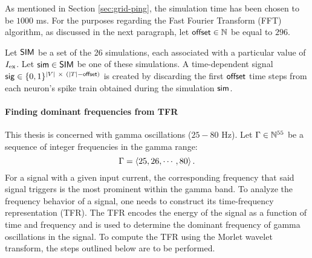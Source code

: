 As mentioned in Section \ref{sec:grid-ping}, the simulation time has been chosen to be $1000$ ms.
For the purposes regarding the Fast Fourier Transform (FFT) algorithm, as discussed in the next paragraph, let $\mathsf{offset} \in \mathbb{N}$ be equal to $296$.

Let $\mathsf{SIM}$ be a set of the 26 simulations, each associated with a particular value of $I_{\mathrm{ex}}$. Let $\mathsf{sim} \in \mathsf{SIM}$ be one of these simulations. A time-dependent signal $\spikesignal \in \{0, 1\} ^ {|V| \ \times \ (|\timesteps| - \offset)}$ is created by discarding the first $\mathsf{offset}$ time steps from each neuron's spike train obtained during the simulation $\mathsf{sim}$.


\paragraph{Finding dominant frequencies from TFR}

This thesis is concerned with gamma oscillations ($25 - 80$ Hz). Let $\Gamma \in \mathbb{N}^{55}$ be a sequence of integer frequencies in the gamma range:
\begin{equation}
    \Gamma = \left<
    25, 26, \cdots, 80
    \right>.
\end{equation}
For a signal with a given input current, the corresponding frequency that said signal triggers is the most prominent within the gamma band. To analyze the frequency behavior of a signal, one needs to construct its time-frequency representation (TFR). 
The TFR encodes the energy of the signal as a function of time and frequency and is used to determine the dominant frequency of gamma oscillations in the signal.
To compute the TFR using the Morlet wavelet transform, the steps outlined below are to be performed.

